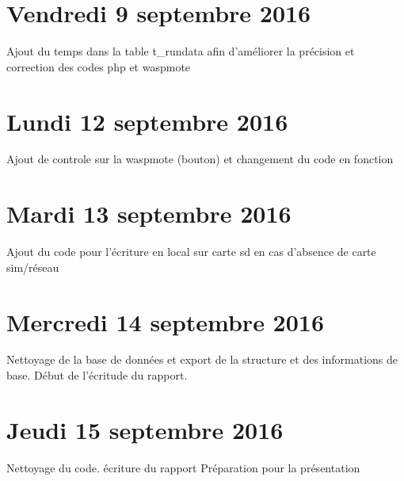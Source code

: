 \documentclass[a4paper,11pt]{article}
\begin{document}
\section{Vendredi 9 septembre 2016}
Ajout du temps dans la table t\_rundata afin d'améliorer la précision et correction des codes php et waspmote

\section{Lundi 12 septembre 2016}
Ajout de controle sur la waspmote (bouton) et changement du code en fonction

\section{Mardi 13 septembre 2016}
Ajout du code pour l'écriture en local sur carte sd en cas d'absence de carte sim/réseau

\section{Mercredi 14 septembre 2016}
Nettoyage de la base de données et export de la structure et des informations de base. \newline
Début de l'écritude du rapport.

\section{Jeudi 15 septembre 2016}
Nettoyage du code.\newline
écriture du rapport\newline
Préparation pour la présentation
\end{document}
